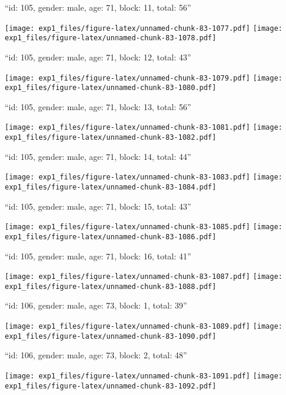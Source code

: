 \documentclass[11pt,,]{article}
\begin{document}
\newpage
[1] 

``id: 105, gender: male, age: 71, block: 11, total: 56''

\texttt{[image: exp1\_files/figure-latex/unnamed-chunk-83-1077.pdf]}
\texttt{[image: exp1\_files/figure-latex/unnamed-chunk-83-1078.pdf]}

\newpage
[1] 

``id: 105, gender: male, age: 71, block: 12, total: 43''

\texttt{[image: exp1\_files/figure-latex/unnamed-chunk-83-1079.pdf]}
\texttt{[image: exp1\_files/figure-latex/unnamed-chunk-83-1080.pdf]}

\newpage
[1] 

``id: 105, gender: male, age: 71, block: 13, total: 56''

\texttt{[image: exp1\_files/figure-latex/unnamed-chunk-83-1081.pdf]}
\texttt{[image: exp1\_files/figure-latex/unnamed-chunk-83-1082.pdf]}

\newpage
[1] 

``id: 105, gender: male, age: 71, block: 14, total: 44''

\texttt{[image: exp1\_files/figure-latex/unnamed-chunk-83-1083.pdf]}
\texttt{[image: exp1\_files/figure-latex/unnamed-chunk-83-1084.pdf]}

\newpage
[1] 

``id: 105, gender: male, age: 71, block: 15, total: 43''

\texttt{[image: exp1\_files/figure-latex/unnamed-chunk-83-1085.pdf]}
\texttt{[image: exp1\_files/figure-latex/unnamed-chunk-83-1086.pdf]}

\newpage
[1] 

``id: 105, gender: male, age: 71, block: 16, total: 41''

\texttt{[image: exp1\_files/figure-latex/unnamed-chunk-83-1087.pdf]}
\texttt{[image: exp1\_files/figure-latex/unnamed-chunk-83-1088.pdf]}

\newpage
[1] 

``id: 106, gender: male, age: 73, block: 1, total: 39''

\texttt{[image: exp1\_files/figure-latex/unnamed-chunk-83-1089.pdf]}
\texttt{[image: exp1\_files/figure-latex/unnamed-chunk-83-1090.pdf]}

\newpage
[1] 

``id: 106, gender: male, age: 73, block: 2, total: 48''

\texttt{[image: exp1\_files/figure-latex/unnamed-chunk-83-1091.pdf]}
\texttt{[image: exp1\_files/figure-latex/unnamed-chunk-83-1092.pdf]}
\end{document}
